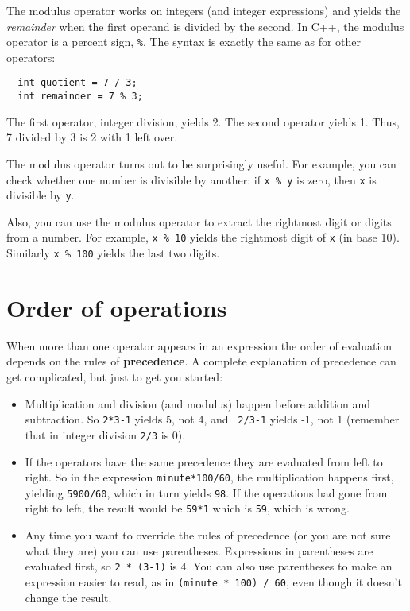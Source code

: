 The modulus operator works on integers (and integer expressions)
and yields the {\em remainder} when the first operand is divided
by the second.  In C++, the modulus operator is a percent sign,
{\tt \%}.  The syntax is exactly the same as for other operators:

\begin{verbatim}
  int quotient = 7 / 3;
  int remainder = 7 % 3;
\end{verbatim}
%
The first operator, integer division, yields 2.  The second
operator yields 1.  Thus, 7 divided by 3 is 2 with 1 left over.

The modulus operator turns out to be surprisingly useful.  For
example, you can check whether one number is divisible by
another: if {\tt x \% y} is zero, then {\tt x} is divisible
by {\tt y}.

Also, you can use the modulus operator to extract the rightmost
digit or digits from a number.  For example, {\tt x \% 10} yields
the rightmost digit of {\tt x} (in base 10).  Similarly
{\tt x \% 100} yields the last two digits.

\section{Order of operations}

When more than one operator appears in an expression the order
of evaluation depends on the rules of {\bf precedence}.  A
complete explanation of precedence can get complicated, but
just to get you started:

\begin{itemize}

\item Multiplication and division (and modulus) happen before
addition and subtraction.  So {\tt 2*3-1} yields 5, not 4, and {\tt
2/3-1} yields -1, not 1 (remember that in integer division {\tt 2/3}
is 0).

\item If the operators have the same precedence they are evaluated
from left to right.  So in the expression {\tt minute*100/60},
the multiplication happens first, yielding {\tt 5900/60}, which
in turn yields {\tt 98}.  If the operations had gone from right
to left, the result would be {\tt 59*1} which is {\tt 59}, which
is wrong.

\item Any time you want to override the rules of precedence (or
you are not sure what they are) you can use parentheses.  Expressions
in parentheses are evaluated first, so {\tt 2 * (3-1)} is 4.
You can also use parentheses to make an expression easier to
read, as in {\tt (minute * 100) / 60}, even though it doesn't
change the result.

\end{itemize}

